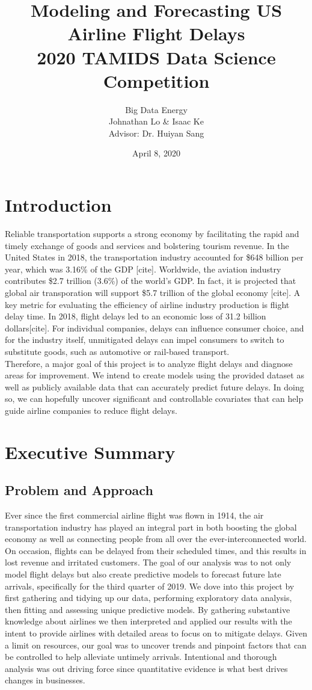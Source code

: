 \documentclass[12pt, a4paper, openany]{book}
\title{Modeling and Forecasting US Airline Flight Delays\\2020 TAMIDS Data Science Competition}
\author{Big Data Energy\\Johnathan Lo \& Isaac Ke\\Advisor: Dr. Huiyan Sang}
\date{April 8, 2020}
\newcommand\tab[1][1cm]{\hspace*{#1}}
\begin{document}
\maketitle
\tableofcontents
\chapter{Introduction}
\tab Reliable transportation supports a strong economy by facilitating the rapid and timely exchange of goods and services and bolstering tourism revenue. In the United States in 2018, the transportation industry accounted for \$648 billion per year, which was 3.16\% of the GDP [cite]. Worldwide, the aviation industry contributes \$2.7 trillion (3.6\%) of the world's GDP. In fact, it is projected that global air transporation will support \$5.7 trillion of the global economy [cite]. A key metric for evaluating the efficiency of airline industry production is flight delay time. In 2018, flight delays led to an economic loss of 31.2 billion dollars[cite]. For individual companies, delays can influence consumer choice, and for the industry itself, unmitigated delays can impel consumers to switch to substitute goods, such as automotive or rail-based transport. \\
\tab Therefore, a major goal of this project is to analyze flight delays and diagnose areas for improvement. We intend to create models using the provided dataset as well as publicly available data that can accurately predict future delays. In doing so, we can hopefully uncover significant and controllable covariates that can help guide airline companies to reduce flight delays. 
\chapter{Executive Summary}
	\section{Problem and Approach}
\tab Ever since the first commercial airline flight was flown in 1914, the air transportation industry has played an integral part in both boosting the global economy as well as connecting people from all over the ever-interconnected world. On occasion, flights can be delayed from their scheduled times, and this results in lost revenue and irritated customers. The goal of our analysis was to not only model flight delays but also create predictive models to forecast future late arrivals, specifically for the third quarter of 2019. We dove into this project by first gathering and tidying up our data, performing exploratory data analysis, then fitting and assessing unique predictive models. By gathering substantive knowledge about airlines we then interpreted and applied our results with the intent to provide airlines with detailed areas to focus on to mitigate delays. Given a limit on resources, our goal was to uncover trends and pinpoint factors that can be controlled to help alleviate untimely arrivals. Intentional and thorough analysis was out driving force since quantitative evidence is what best drives changes in businesses.
\end{document}
